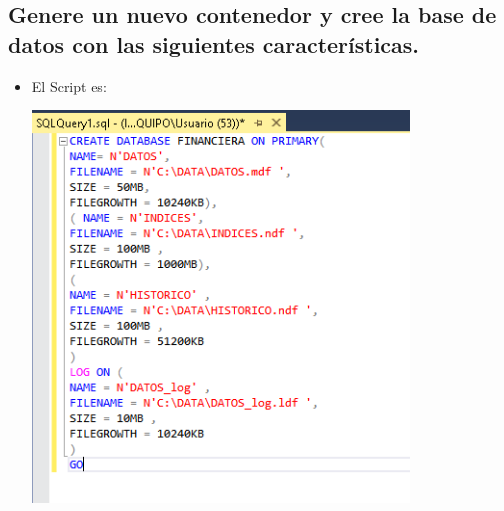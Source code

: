 \subsection {Genere un nuevo contenedor y cree la base de datos con las siguientes características.}
\begin{itemize}
\item El Script es:



\begin{center}
	\includegraphics[width=10cm]{./Imagenes/Actividad4} 
	\end{center}

\end{itemize} 